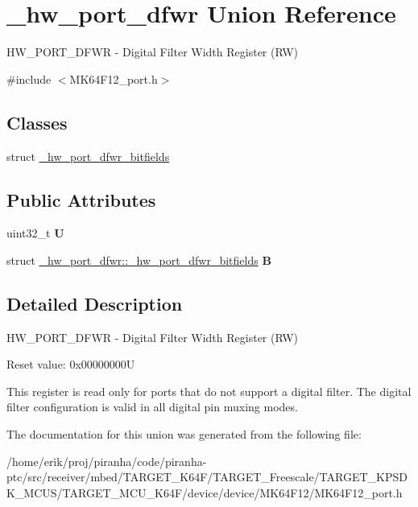 \hypertarget{union__hw__port__dfwr}{}\section{\+\_\+hw\+\_\+port\+\_\+dfwr Union Reference}
\label{union__hw__port__dfwr}


H\+W\+\_\+\+P\+O\+R\+T\+\_\+\+D\+F\+WR -\/ Digital Filter Width Register (RW)  




{\ttfamily \#include $<$M\+K64\+F12\+\_\+port.\+h$>$}

\subsection*{Classes}
\begin{DoxyCompactItemize}
\item 
struct \hyperlink{struct__hw__port__dfwr_1_1__hw__port__dfwr__bitfields}{\+\_\+hw\+\_\+port\+\_\+dfwr\+\_\+bitfields}
\end{DoxyCompactItemize}
\subsection*{Public Attributes}
\begin{DoxyCompactItemize}
\item 
uint32\+\_\+t {\bfseries U}\hypertarget{union__hw__port__dfwr_a3e229480eac71e9d6f2f4ec23303ffee}{}\label{union__hw__port__dfwr_a3e229480eac71e9d6f2f4ec23303ffee}

\item 
struct \hyperlink{struct__hw__port__dfwr_1_1__hw__port__dfwr__bitfields}{\+\_\+hw\+\_\+port\+\_\+dfwr\+::\+\_\+hw\+\_\+port\+\_\+dfwr\+\_\+bitfields} {\bfseries B}\hypertarget{union__hw__port__dfwr_ae636867c4fedffb5e6ca318669fb2121}{}\label{union__hw__port__dfwr_ae636867c4fedffb5e6ca318669fb2121}

\end{DoxyCompactItemize}


\subsection{Detailed Description}
H\+W\+\_\+\+P\+O\+R\+T\+\_\+\+D\+F\+WR -\/ Digital Filter Width Register (RW) 

Reset value\+: 0x00000000U

This register is read only for ports that do not support a digital filter. The digital filter configuration is valid in all digital pin muxing modes. 

The documentation for this union was generated from the following file\+:\begin{DoxyCompactItemize}
\item 
/home/erik/proj/piranha/code/piranha-\/ptc/src/receiver/mbed/\+T\+A\+R\+G\+E\+T\+\_\+\+K64\+F/\+T\+A\+R\+G\+E\+T\+\_\+\+Freescale/\+T\+A\+R\+G\+E\+T\+\_\+\+K\+P\+S\+D\+K\+\_\+\+M\+C\+U\+S/\+T\+A\+R\+G\+E\+T\+\_\+\+M\+C\+U\+\_\+\+K64\+F/device/device/\+M\+K64\+F12/M\+K64\+F12\+\_\+port.\+h\end{DoxyCompactItemize}
